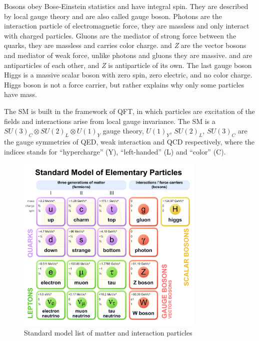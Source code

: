 Bosons obey Bose-Einstein statistics and have integral spin.
They are described by local gauge theory and are also called gauge boson.
Photons are the interaction particle of electromagnetic force, they are massless
and only interact with charged particles. Gluons are the mediator of strong force
between the quarks, they are massless and carries color charge. \Wplusminus{} and \textit{Z}
are the vector bosons and mediator of weak force,
unlike photons and gluons they are massive. \Wplus{} and \Wminus{}
are antiparticles of each other, and \textit{Z} is antiparticle of its own.
The last gauge boson Higgs is a massive scalar boson with zero spin,
zero electric, and no color charge. Higgs boson is not a force carrier,
but rather explains why only some particles have mass.

The \gls{SM} is built in the framework of \gls{QFT}, in which particles
are excitation of the fields and interactions arise from local gauge
invariance. The \gls{SM} is a \( {SU(3)}_C \otimes {SU(2)}_L \otimes {U(1)}_Y\)
gauge theory, \( {U(1)}_Y \), \( {SU(2)}_L \), \( {SU(3)}_C \) are the gauge symmetries
of \gls{QED}, weak interaction and \gls{QCD} respectively, where the indices
stands for ``hypercharge'' (Y), ``left-handed'' (L) and ``color'' (C).

\begin{figure}[!ht]
  \centering
  \includegraphics[width=0.8\textwidth]{figures/Standard_Model_of_Elementary_Particles.pdf}
  \caption[Standard model list of matter and interaction particles]%
  {Standard model list of matter and interaction particles~\cite{image-standard-model}}%
  \label{fig:standard-model-details}
\end{figure}

